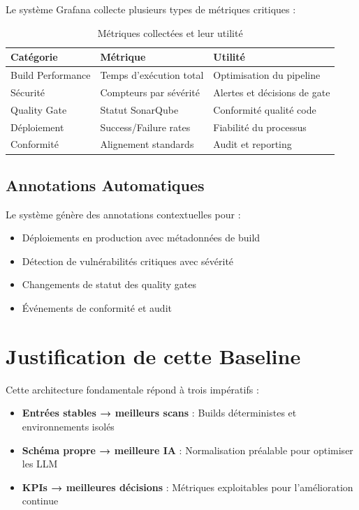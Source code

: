 \documentclass[12pt,a4paper]{report}
\begin{document}
Le système Grafana collecte plusieurs types de métriques critiques :

\begin{table}[H]
    \centering
    \begin{tabularx}{\textwidth}{|X|X|X|}
        \hline
        \textbf{Catégorie} & \textbf{Métrique} & \textbf{Utilité} \\
        \hline
        Build Performance & Temps d'exécution total & Optimisation du pipeline \\
        \hline
        Sécurité & Compteurs par sévérité & Alertes et décisions de gate \\
        \hline
        Quality Gate & Statut SonarQube & Conformité qualité code \\
        \hline
        Déploiement & Success/Failure rates & Fiabilité du processus \\
        \hline
        Conformité & Alignement standards & Audit et reporting \\
        \hline
    \end{tabularx}
    \caption{Métriques collectées et leur utilité}
\end{table}

\subsection{Annotations Automatiques}

Le système génère des annotations contextuelles pour :
\begin{itemize}
    \item Déploiements en production avec métadonnées de build
    \item Détection de vulnérabilités critiques avec sévérité
    \item Changements de statut des quality gates
    \item Événements de conformité et audit
\end{itemize}

\section{Justification de cette Baseline}

Cette architecture fondamentale répond à trois impératifs :

\begin{itemize}
    \item \textbf{Entrées stables → meilleurs scans} : Builds déterministes et environnements isolés
    \item \textbf{Schéma propre → meilleure IA} : Normalisation préalable pour optimiser les LLM
    \item \textbf{KPIs → meilleures décisions} : Métriques exploitables pour l'amélioration continue
\end{itemize}
\end{document}
